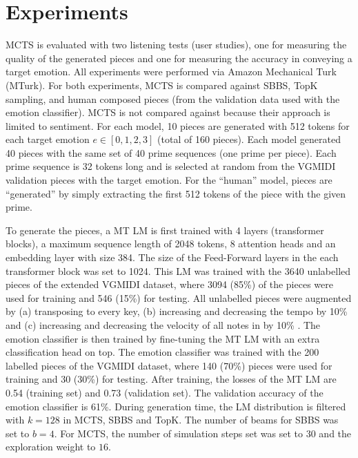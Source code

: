 \section{Experiments}

MCTS is evaluated with two listening tests (user studies), one for measuring the quality of the generated pieces and one for measuring the accuracy in conveying a target emotion. All experiments were performed via Amazon Mechanical Turk (MTurk). For both experiments, MCTS is compared against SBBS, TopK sampling, and human composed pieces (from the validation data used with the emotion classifier). MCTS is not compared against \citet{ferreira_2019} because their approach is limited to sentiment. For each model, 10 pieces are generated with 512 tokens for each target emotion $e \in [0, 1, 2, 3]$ (total of 160 pieces). Each model generated 40 pieces with the same set of 40 prime sequences (one prime per piece). Each prime sequence is 32 tokens long and is selected at random from the VGMIDI validation pieces with the target emotion. For the ``human'' model, pieces are ``generated'' by simply extracting the first 512 tokens of the piece with the given prime.

To generate the pieces, a MT LM is first trained with 4 layers (transformer blocks), a maximum sequence length of 2048 tokens, 8 attention heads and an embedding layer with size 384. The size of the Feed-Forward layers in the each transformer block was set to 1024. This LM was trained with the 3640 unlabelled pieces of the extended VGMIDI dataset, where 3094 (85\%) of the pieces were used for training and 546 (15\%) for testing. All unlabelled pieces were augmented by (a) transposing to every key, (b) increasing and decreasing the tempo by 10\% and (c) increasing and decreasing the velocity of all notes in by 10\% \cite{oore2017learning}. The emotion classifier is then trained by fine-tuning the MT LM with an extra classification head on top. The emotion classifier was trained with the 200 labelled pieces of the VGMIDI dataset, where 140 (70\%) pieces were used for training and 30 (30\%) for testing. After training, the losses of the MT LM are 0.54 (training set) and 0.73 (validation set). The validation accuracy of the emotion classifier is 61\%. During generation time, the LM distribution is filtered with $k = 128$ in MCTS, SBBS and TopK. The number of beams for SBBS was set to $b = 4$. For MCTS, the number of simulation steps set was set to $30$ and the exploration weight to $16$.


